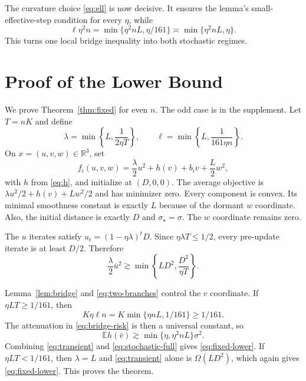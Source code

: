 \documentclass[twoside]{article}
\newcommand{\E}{\mathbb E}
\newcommand{\R}{\mathbb R}
\newcommand{\asympdown}{\mathrel{\gtrsim}}
\begin{document}
The curvature choice \eqref{eq:ell} is now decisive. It ensures the lemma's
small-effective-step condition for every $\eta$, while
\begin{equation}
 \ell\eta^2n
 =\min\{\eta^2nL,\eta/161\}
 \asymp\min\{\eta^2nL,\eta\}.
 \label{eq:two-branches}
\end{equation}
This turns one local bridge inequality into both stochastic regimes.

\section{Proof of the Lower Bound}
\label{sec:proof}

We prove Theorem~\ref{thm:fixed} for even $n$. The odd case is in the
supplement. Let $T=nK$ and define
\begin{equation}
 \lambda=\min\left\{L,\frac{1}{2\eta T}\right\},
 \qquad \ell=\min\left\{L,\frac{1}{161\eta n}\right\}.
 \label{eq:curvatures}
\end{equation}
On $x=(u,v,w)\in\R^3$, set
\begin{equation}
 f_i(u,v,w)=\frac\lambda2u^2+h(v)+b_iv+\frac L2w^2,
 \label{eq:hard}
\end{equation}
with $h$ from \eqref{eq:h}, and initialize at $(D,0,0)$. The average objective
is $\lambda u^2/2+h(v)+Lw^2/2$ and has minimizer zero. Every component is
convex. Its minimal smoothness constant is exactly $L$ because of the dormant
$w$ coordinate. Also, the initial distance is exactly $D$ and
$\sigma_\star=\sigma$. The $w$ coordinate remains zero.

The $u$ iterates satisfy $u_t=(1-\eta\lambda)^tD$. Since
$\eta\lambda T\le1/2$, every pre-update iterate is at least $D/2$. Therefore
\begin{equation}
 \frac\lambda2\bar u^2
 \asympdown \min\left\{LD^2,\frac{D^2}{\eta T}\right\}.
 \label{eq:transient}
\end{equation}

Lemma~\ref{lem:bridge} and \eqref{eq:two-branches} control the $v$ coordinate.
If $\eta L T\ge1/161$, then
\[
 K\eta\ell n=K\min\{\eta nL,1/161\}\ge1/161.
\]
The attenuation in \eqref{eq:bridge-risk} is then a universal constant, so
\begin{equation}
 \E h(\bar v)
 \asympdown\min\{\eta,\eta^2nL\}\sigma^2.
 \label{eq:stochastic-full}
\end{equation}
Combining \eqref{eq:transient} and \eqref{eq:stochastic-full} gives
\eqref{eq:fixed-lower}. If $\eta LT<1/161$, then $\lambda=L$ and
\eqref{eq:transient} alone is $\Omega(LD^2)$, which again gives
\eqref{eq:fixed-lower}. This proves the theorem.
\end{document}
